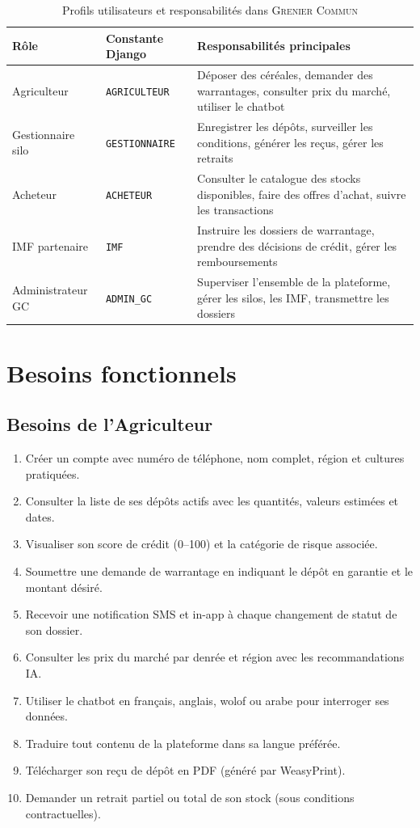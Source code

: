 \documentclass[12pt,a4paper,twoside]{report}
\newcommand{\gc}{\textsc{Grenier Commun}}
\begin{document}
\begin{table}[H]
\centering
\caption{Profils utilisateurs et responsabilités dans \gc{}}
\label{tab:acteurs}
\begin{tabular}{L{3cm}L{4.5cm}L{6cm}}
\toprule
\textbf{Rôle} & \textbf{Constante Django} & \textbf{Responsabilités principales} \\
\midrule
Agriculteur        & \texttt{AGRICULTEUR}   & Déposer des céréales, demander des warrantages, consulter prix du marché, utiliser le chatbot \\
Gestionnaire silo  & \texttt{GESTIONNAIRE}  & Enregistrer les dépôts, surveiller les conditions, générer les reçus, gérer les retraits \\
Acheteur           & \texttt{ACHETEUR}      & Consulter le catalogue des stocks disponibles, faire des offres d'achat, suivre les transactions \\
IMF partenaire     & \texttt{IMF}           & Instruire les dossiers de warrantage, prendre des décisions de crédit, gérer les remboursements \\
Administrateur GC  & \texttt{ADMIN\_GC}     & Superviser l'ensemble de la plateforme, gérer les silos, les IMF, transmettre les dossiers \\
\bottomrule
\end{tabular}
\end{table}

\section{Besoins fonctionnels}

\subsection{Besoins de l'Agriculteur}

\begin{enumerate}[label=\textbf{BF-A\arabic*}]
  \item Créer un compte avec numéro de téléphone, nom complet, région et cultures pratiquées.
  \item Consulter la liste de ses dépôts actifs avec les quantités, valeurs estimées et dates.
  \item Visualiser son score de crédit (0--100) et la catégorie de risque associée.
  \item Soumettre une demande de warrantage en indiquant le dépôt en garantie et le montant désiré.
  \item Recevoir une notification SMS et in-app à chaque changement de statut de son dossier.
  \item Consulter les prix du marché par denrée et région avec les recommandations IA.
  \item Utiliser le chatbot en français, anglais, wolof ou arabe pour interroger ses données.
  \item Traduire tout contenu de la plateforme dans sa langue préférée.
  \item Télécharger son reçu de dépôt en PDF (généré par WeasyPrint).
  \item Demander un retrait partiel ou total de son stock (sous conditions contractuelles).
\end{enumerate}
\end{document}
